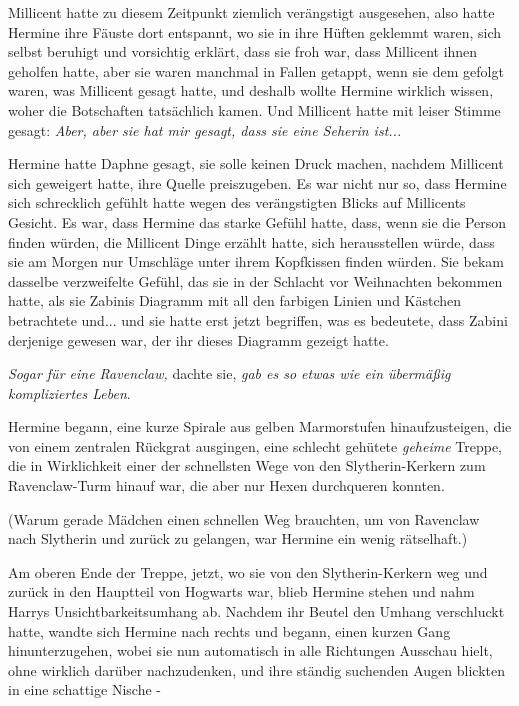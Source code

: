 Millicent hatte zu diesem Zeitpunkt ziemlich verängstigt ausgesehen, also hatte
Hermine ihre Fäuste dort entspannt, wo sie in ihre Hüften geklemmt waren, sich
selbst beruhigt und vorsichtig erklärt, dass sie froh war, dass Millicent ihnen
geholfen hatte, aber sie waren manchmal in Fallen getappt, wenn sie dem gefolgt
waren, was Millicent gesagt hatte, und deshalb wollte Hermine wirklich wissen,
woher die Botschaften tatsächlich kamen. Und Millicent hatte mit leiser Stimme
gesagt: \emph{Aber, aber sie hat mir gesagt, dass sie eine Seherin ist...}

Hermine hatte Daphne gesagt, sie solle keinen Druck machen, nachdem Millicent
sich geweigert hatte, ihre Quelle preiszugeben. Es war nicht nur so, dass
Hermine sich schrecklich gefühlt hatte wegen des verängstigten Blicks auf
Millicents Gesicht. Es war, dass Hermine das starke Gefühl hatte, dass, wenn sie
die Person finden würden, die Millicent Dinge erzählt hatte, sich herausstellen
würde, dass sie am Morgen nur Umschläge unter ihrem Kopfkissen finden würden.
Sie bekam dasselbe verzweifelte Gefühl, das sie in der Schlacht vor Weihnachten
bekommen hatte, als sie Zabinis Diagramm mit all den farbigen Linien und
Kästchen betrachtete und... und sie hatte erst jetzt begriffen, was es
bedeutete, dass Zabini derjenige gewesen war, der ihr dieses Diagramm gezeigt
hatte.

\emph{Sogar für eine Ravenclaw,} dachte sie, \emph{gab es so etwas wie ein
übermäßig kompliziertes Leben}.

Hermine begann, eine kurze Spirale aus gelben Marmorstufen hinaufzusteigen, die
von einem zentralen Rückgrat ausgingen, eine schlecht gehütete \glqq{}
\emph{geheime}\grqq{} Treppe, die in Wirklichkeit einer der schnellsten Wege von
den Slytherin-Kerkern zum Ravenclaw-Turm hinauf war, die aber nur Hexen
durchqueren konnten.

(Warum gerade Mädchen einen schnellen Weg brauchten, um von Ravenclaw nach
Slytherin und zurück zu gelangen, war Hermine ein wenig rätselhaft.)

Am oberen Ende der Treppe, jetzt, wo sie von den Slytherin-Kerkern weg und
zurück in den Hauptteil von Hogwarts war, blieb Hermine stehen und nahm Harrys
Unsichtbarkeitsumhang ab. Nachdem ihr Beutel den Umhang verschluckt hatte,
wandte sich Hermine nach rechts und begann, einen kurzen Gang hinunterzugehen,
wobei sie nun automatisch in alle Richtungen Ausschau hielt, ohne wirklich
darüber nachzudenken, und ihre ständig suchenden Augen blickten in eine
schattige Nische -

